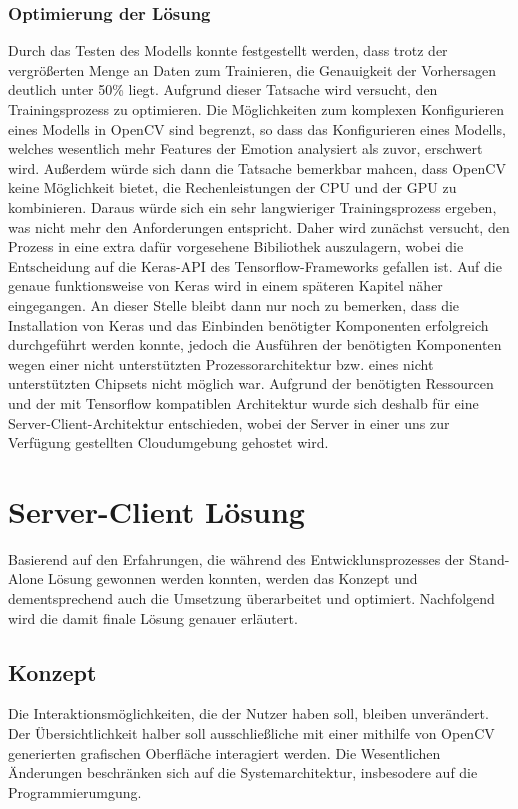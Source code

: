 \documentclass[12pt, a4paper]{report}
\begin{document}
\subsection{Optimierung der Lösung}
Durch das Testen des Modells konnte festgestellt werden, dass trotz der vergrößerten Menge an Daten zum Trainieren, die Genauigkeit der Vorhersagen deutlich unter 50\% liegt. Aufgrund dieser Tatsache wird versucht, den Trainingsprozess zu optimieren. Die Möglichkeiten zum komplexen Konfigurieren eines Modells in OpenCV sind begrenzt, so dass das Konfigurieren eines Modells, welches wesentlich mehr Features der Emotion analysiert als zuvor, erschwert wird. Außerdem würde sich dann die Tatsache bemerkbar mahcen, dass OpenCV keine Möglichkeit bietet, die  Rechenleistungen der CPU und der GPU zu kombinieren. Daraus würde sich ein sehr langwieriger Trainingsprozess ergeben, was nicht mehr den Anforderungen entspricht. Daher wird zunächst versucht, den Prozess in eine extra dafür vorgesehene Bibiliothek auszulagern, wobei die Entscheidung auf die Keras-API des Tensorflow-Frameworks gefallen ist. Auf die genaue funktionsweise von Keras wird in einem späteren Kapitel näher eingegangen. An dieser Stelle bleibt dann nur noch zu bemerken, dass die Installation von Keras und das Einbinden benötigter Komponenten erfolgreich durchgeführt werden konnte, jedoch die Ausführen der benötigten Komponenten wegen einer nicht unterstützten Prozessorarchitektur bzw. eines nicht unterstützten Chipsets nicht möglich war. Aufgrund der benötigten Ressourcen und der mit Tensorflow kompatiblen Architektur wurde sich deshalb für eine Server-Client-Architektur entschieden, wobei der Server in einer uns zur Verfügung gestellten Cloudumgebung gehostet wird.

\chapter{Server-Client Lösung}
Basierend auf den Erfahrungen, die während des Entwicklunsprozesses der Stand-Alone Lösung gewonnen werden konnten, werden das Konzept und dementsprechend auch die Umsetzung überarbeitet und optimiert. Nachfolgend wird die damit finale Lösung genauer erläutert.

\section{Konzept}
Die Interaktionsmöglichkeiten, die der Nutzer haben soll, bleiben unverändert. Der Übersichtlichkeit halber soll ausschließliche mit einer mithilfe von OpenCV generierten grafischen Oberfläche interagiert werden. Die Wesentlichen Änderungen beschränken sich auf die Systemarchitektur, insbesodere auf die Programmierumgung.
\end{document}

